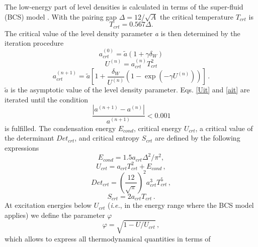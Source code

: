 \documentclass[twocolumn,amsmath,amssymb,10pt,groupedaddress,letter]{revtex4}
\begin{document}
The low-energy part of level densities
is calculated in terms of the super-fluid (BCS) model
\cite{igna}. With the pairing gap $\Delta=12/\sqrt{A}$ the critical
temperature $T_{crt}$ is
\begin{equation}
T_{crt}=0.567\Delta.\label{Tcrt}
\end{equation}
The critical value of the level density parameter \emph{a} is then
determined by the iteration procedure
\begin{equation}
a_{crt}^{(0)}=\widetilde{a}\left(1+\gamma\delta_{W}\right)\label{ait0}
\end{equation}
\begin{equation}
U^{(n)}=a_{crt}^{(n)}T_{crt}^{2}\label{Uit}
\end{equation}
\begin{equation}
a_{crt}^{(n+1)}=\widetilde{a}\left[1+\frac{\delta_{W}}{U^{(n)}}\left(1-\exp\left(-\gamma U^{(n)}\right)\right)\right]\,.\label{ait}
\end{equation}
$\widetilde{a}$ is the asymptotic value of the level density parameter.
Eqs. \ref{Uit} and \ref{ait} are iterated until the condition
\begin{equation}
\frac{\left|a^{(n+1)}-a^{(n)}\right|}{a^{(n+1)}}<0.001\label{itercond}
\end{equation}
is fulfilled. The condensation energy $E_{cond}$, critical energy
$U_{crt}$, a critical value of the determinant $Det_{crt}$, and
critical entropy $S_{crt}$ are defined by the following expressions
\begin{equation}
E_{cond}=1.5a_{crt}\Delta^{2}/\pi^{2},\label{Econd}
\end{equation}
\begin{equation}
U_{crt}=a_{crt}T_{crt}^{2}+E_{cond}\,,\label{Ucrt}
\end{equation}
\begin{equation}
Det_{crt}=\left(\frac{12}{\sqrt{\pi}}\right)^{2}a_{crt}^{3}T_{crt}^{5}\,,\label{Detcrt}
\end{equation}
\begin{equation}
S_{crt}=2a_{crt}T_{crt}\,.\label{Scrt}
\end{equation}
At excitation energies below $U_{crt}$ ({\it i.e.}, in the energy range
\noindent where the BCS model applies) we define the parameter $\varphi$
\begin{equation}
\varphi=\sqrt{1-U/U_{crt}}\,,\label{fiign}
\end{equation}
which allows to express all thermodynamical quantities in terms of
\end{document}

